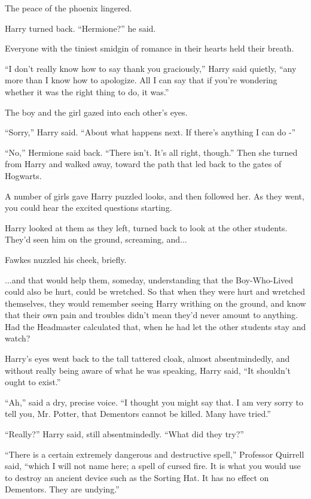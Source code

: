 The peace of the phoenix lingered.

Harry turned back. ``Hermione?'' he said.

Everyone with the tiniest smidgin of romance in their hearts held their
breath.

``I don't really know how to say thank you graciously,'' Harry said
quietly, ``any more than I know how to apologize. All I can say that if
you're wondering whether it was the right thing to do, it was.''

The boy and the girl gazed into each other's eyes.

``Sorry,'' Harry said. ``About what happens next. If there's anything I
can do -''

``No,'' Hermione said back. ``There isn't. It's all right, though.''
Then she turned from Harry and walked away, toward the path that led
back to the gates of Hogwarts.

A number of girls gave Harry puzzled looks, and then followed her. As
they went, you could hear the excited questions starting.

Harry looked at them as they left, turned back to look at the other
students. They'd seen him on the ground, screaming, and...

Fawkes nuzzled his cheek, briefly.

...and that would help them, someday, understanding that the
Boy-Who-Lived could also be hurt, could be wretched. So that when they
were hurt and wretched themselves, they would remember seeing Harry
writhing on the ground, and know that their own pain and troubles didn't
mean they'd never amount to anything. Had the Headmaster calculated
that, when he had let the other students stay and watch?

Harry's eyes went back to the tall tattered cloak, almost
absentmindedly, and without really being aware of what he was speaking,
Harry said, ``It shouldn't ought to exist.''

``Ah,'' said a dry, precise voice. ``I thought you might say that. I am
very sorry to tell you, Mr. Potter, that Dementors cannot be killed.
Many have tried.''

``Really?'' Harry said, still absentmindedly. ``What did they try?''

``There is a certain extremely dangerous and destructive spell,''
Professor Quirrell said, ``which I will not name here; a spell of cursed
fire. It is what you would use to destroy an ancient device such as the
Sorting Hat. It has no effect on Dementors. They are undying.''

